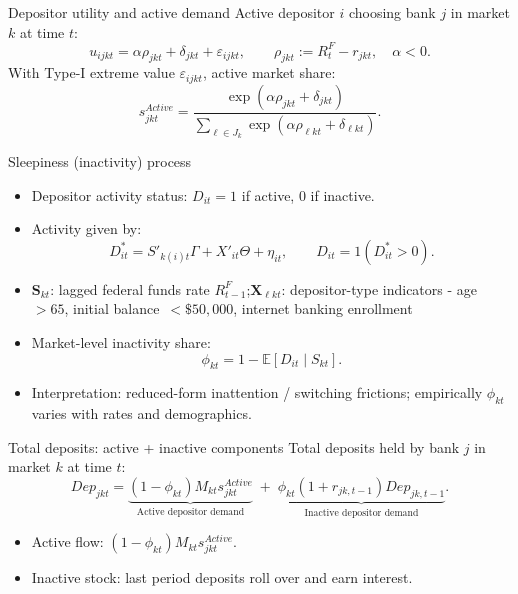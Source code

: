 \documentclass[10pt,aspectratio=169]{beamer}
\begin{document}
\begin{frame}{Depositor utility and active demand}
Active depositor $i$ choosing bank $j$ in market $k$ at time $t$:
\[
u_{ijkt} = \alpha \rho_{jkt} + \delta_{jkt} + \varepsilon_{ijkt},
\qquad \rho_{jkt} := R_t^F - r_{jkt},\quad \alpha < 0.
\]
With Type-I extreme value $\varepsilon_{ijkt}$, active market share:
\[
s^{Active}_{jkt} = \frac{\exp(\alpha \rho_{jkt} + \delta_{jkt})}{\sum_{\ell\in J_k}\exp(\alpha \rho_{\ell kt} + \delta_{\ell kt})}. \tag{3}
\]
\end{frame}
\begin{frame}{Sleepiness (inactivity) process}

\begin{itemize}
	\item Depositor activity status: $D_{it} = 1$ if active, $0$ if inactive.
	\item Activity given by: 
	\[
	D_{it}^* = S'_{k(i)t}\Gamma + X'_{it}\Theta + \eta_{it},
	\qquad D_{it} = 1(D_{it}^*>0). \tag{2}
	\]

	\item $\mathbf{S}_{kt}$: lagged federal funds rate $R_{t-1}^F$;\quad $\mathbf{X}_{\ell kt}$: depositor-type indicators - age~$>65$, initial balance~$<\$50{,}000$, internet banking enrollment


	\item Market-level inactivity share:
	\[
	\phi_{kt} = 1 - \mathbb{E}[D_{it}\mid S_{kt}].
	\]

	\item Interpretation: reduced-form inattention / switching frictions; empirically $\phi_{kt}$ varies with rates and demographics.

\end{itemize}
 
 
\end{frame}





\begin{frame}{Total deposits: active + inactive components}
Total deposits held by bank $j$ in market $k$ at time $t$:
\[
Dep_{jkt} =
\underbrace{(1-\phi_{kt})M_{kt}s^{Active}_{jkt}}_{\text{Active depositor demand}} 
\;+\;
\underbrace{\phi_{kt}(1+r_{jk,t-1})Dep_{jk,t-1}}_{\text{Inactive depositor demand}}. \tag{4}
\]
\begin{itemize}
	\item Active flow: $(1-\phi_{kt})M_{kt}s^{Active}_{jkt}$.
	\item Inactive stock: last period deposits roll over and earn interest.
\end{itemize}
\end{frame}
\end{document}
